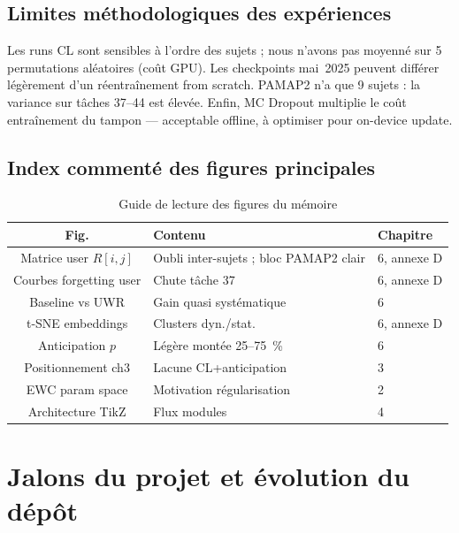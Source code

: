 \documentclass[a4paper,12pt]{report}
\begin{document}
\section{Limites méthodologiques des expériences}

Les runs CL sont sensibles à l'ordre des sujets ; nous n'avons pas moyenné sur
5 permutations aléatoires (coût GPU). Les checkpoints mai~2025 peuvent différer
légèrement d'un réentraînement from scratch. PAMAP2 n'a que 9 sujets : la
variance sur tâches 37--44 est élevée. Enfin, MC Dropout multiplie le coût
entraînement du tampon — acceptable offline, à optimiser pour on-device update.

\section{Index commenté des figures principales}

\begin{table}[H]
\centering
\small
\begin{tabularx}{\textwidth}{|c|Y|Y|}
\hline
\textbf{Fig.} & \textbf{Contenu} & \textbf{Chapitre} \\
\hline
Matrice user $R[i,j]$ & Oubli inter-sujets ; bloc PAMAP2 clair & 6, annexe D \\
Courbes forgetting user & Chute tâche 37 & 6, annexe D \\
Baseline vs UWR & Gain quasi systématique & 6 \\
t-SNE embeddings & Clusters dyn./stat. & 6, annexe D \\
Anticipation $p$ & Légère montée 25--75~\% & 6 \\
Positionnement ch3 & Lacune CL+anticipation & 3 \\
EWC param space & Motivation régularisation & 2 \\
Architecture TikZ & Flux modules & 4 \\
\hline
\end{tabularx}
\caption{Guide de lecture des figures du mémoire}
\label{tab:app_fig_guide}
\end{table}

\FloatBarrier



\chapter{Jalons du projet et évolution du dépôt}
\label{app:timeline}
\end{document}
